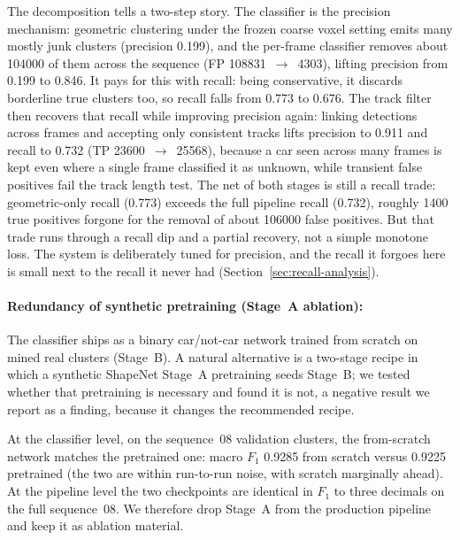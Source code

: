 The decomposition tells a two-step story. The classifier
is the precision mechanism: geometric clustering under the frozen coarse voxel
setting emits many mostly junk clusters (precision \num{0.199}), and the per-frame
classifier removes about \num{104000} of them across the sequence
(FP \num{108831}~$\rightarrow$~\num{4303}), lifting precision from \num{0.199} to
\num{0.846}. It pays for this with recall: being conservative, it discards
borderline true clusters too, so recall falls from \num{0.773} to \num{0.676}.
The track filter then recovers that recall while improving precision
again: linking detections across frames and accepting only consistent tracks
lifts precision to \num{0.911} and recall to \num{0.732} (TP
\num{23600}~$\rightarrow$~\num{25568}), because a car seen across many frames is
kept even where a single frame classified it as unknown, while transient
false positives fail the track length test. The net of both stages is still a
recall trade: geometric-only recall (\num{0.773}) exceeds the full pipeline
recall (\num{0.732}), roughly \num{1400} true positives forgone for the
removal of about \num{106000} false positives. But that trade runs through a
recall dip and a partial recovery, not a simple monotone loss. The system is deliberately tuned for precision, and the
recall it forgoes here is small next to the recall it never had (Section~\ref{sec:recall-analysis}).

\paragraph{Redundancy of synthetic pretraining (Stage~A ablation):}
\label{sec:ablation-stagea}

The classifier ships as a binary car/not-car network trained from scratch
on mined real clusters (Stage~B). A natural alternative is a two-stage
recipe in which a synthetic ShapeNet Stage~A pretraining seeds Stage~B; we tested
whether that pretraining is necessary and found it is not, a negative result we
report as a finding, because it changes the recommended recipe.

At the classifier level, on the sequence~08 validation clusters, the from-scratch
network matches the pretrained one: macro $F_1$ \num{0.9285} from scratch versus
\num{0.9225} pretrained (the two are within run-to-run noise, with
scratch marginally ahead). At the pipeline level the two checkpoints are
identical in $F_1$ to three decimals on the full sequence~08. We therefore
drop Stage~A from the production pipeline and keep it as ablation material.

